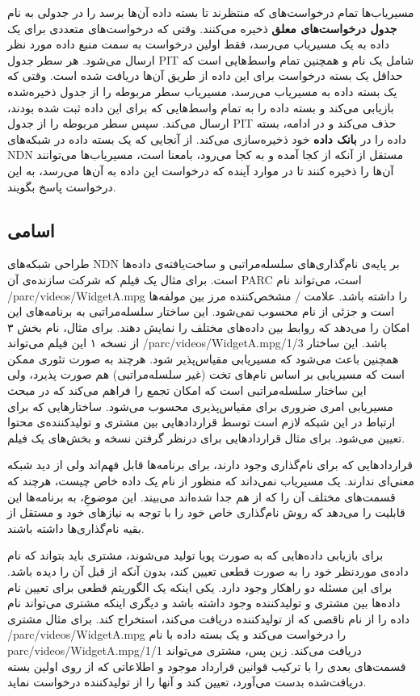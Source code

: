 مسیریاب‌ها تمام درخواست‌‌های که منتظرند تا بسته داده آن‌ها برسد را در جدولی به نام \textbf{جدول درخواست‌‌های معلق} ذخیره‌ می‌کنند. وقتی که درخواست‌‌‌های متعددی برای یک داده به یک مسیریاب می‌رسد، فقط اولین درخواست به سمت منبع داده مورد نظر ارسال می‌شود. هر سطر جدول PIT شامل یک نام و همچنین تمام واسط‌‌هایی است که حداقل یک بسته درخواست برای این داده از طریق آن‌ها دریافت شده است. وقتی که یک بسته داده به مسیریاب می‌رسد، مسیریاب سطر مربوطه را از جدول ذخیره‌شده بازیابی می‌کند و بسته داده را به تمام واسط‌هایی که برای این داده ثبت شده بودند، ارسال می‌کند. سپس سطر مربوطه را از جدول PIT  حذف می‌کند و در ادامه، بسته داده را در \textbf{بانک داده} خود ذخیره‌سازی می‌کند. از آنجایی که یک بسته داده در شبکه‌های NDN مستقل از آنکه از کجا آمده و به کجا می‌رود، بامعنا است، مسیریاب‌ها می‌توانند آن‌ها را ذخیره کنند تا در موارد آینده که درخواست این داده به آن‌ها می‌رسد، به این درخواست پاسخ بگویند. 

\subsection{اسامی}
طراحی شبکه‌های NDN بر پایه‌ی نام‌گذاری‌های سلسله‌مراتبی و ساخت‌یافته‌ی داده‌ها است. برای مثال یک فیلم که شرکت سازنده‌ی آن PARC است، می‌تواند نام /parc/videos/WidgetA.mpg را داشته باشد. علامت / مشخص‌کننده مرز بین مولفه‌ها است و جزئی از نام محسوب نمی‌شود. این ساختار سلسله‌مراتبی به برنامه‌های این امکان را می‌دهد که روابط بین داده‌های مختلف را نمایش دهند. برای مثال، نام بخش ۳ از نسخه ۱ این فیلم می‌تواند /parc/videos/WidgetA.mpg/1/3 باشد. این ساختار همچنین باعث می‌شود که مسیریابی مقیاس‌پذیر شود. هرچند به صورت تئوری ممکن است که مسیریابی بر اساس نام‌های تخت (غیر سلسله‌مراتبی) هم صورت پذیرد،
\cite{rofl}
 ولی این ساختار سلسله‌مراتبی است که امکان تجمع را فراهم می‌کند که در مبحث مسیریابی امری ضروری برای مقیاس‌پذیری محسوب می‌شود. ساختارهایی که برای ارتباط در این شبکه لازم است توسط قرارداد‌هایی بین مشتری و تولیدکننده‌ی محتوا تعیین می‌شود. برای مثال قراردادهایی برای درنظر گرفتن نسخه و بخش‌های یک فیلم.
 
قراردادهایی که برای نام‌گذاری وجود دارند، برای برنامه‌ها قابل فهم‌اند ولی از دید شبکه معنی‌ای ندارند. یک مسیریاب نمی‌داند که منظور از نام یک داده خاص چیست، هرچند که قسمت‌های مختلف آن را که از هم جدا شده‌اند می‌بیند. این موضوعِ، به برنامه‌ها این قابلیت را می‌دهد که روش نام‌گذاری خاص خود را با توجه به نیاز‌های خود و مستقل از بقیه نام‌گذاری‌ها داشته باشند. 

برای بازیابی داده‌هایی که به صورت پویا تولید می‌شوند، مشتری باید بتواند که نام داده‌ی موردنظر خود را به صورت قطعی تعیین کند، بدون آنکه از قبل آن را دیده باشد. برای این مسئله دو راهکار وجود دارد. یکی اینکه یک الگوریتم قطعی برای تعیین نام داده‌ها بین مشتری و تولیدکننده وجود داشته باشد  و دیگری اینکه مشتری می‌تواند نام داده را از نام ناقصی که از تولیدکننده دریافت‌ می‌کند، استخراج کند. برای مثال مشتری /parc/videos/WidgetA.mpg را درخواست می‌کند و یک بسته داده با نام  parc/videos/WidgetA.mpg/1/1 دریافت می‌کند. زین پس، مشتری می‌تواند قسمت‌های بعدی را با ترکیب قوانین قرارداد موجود و اطلاعاتی که از روی اولین بسته دریافت‌شده بدست می‌آورد، تعیین کند و آنها را از تولیدکننده درخواست نماید. 

